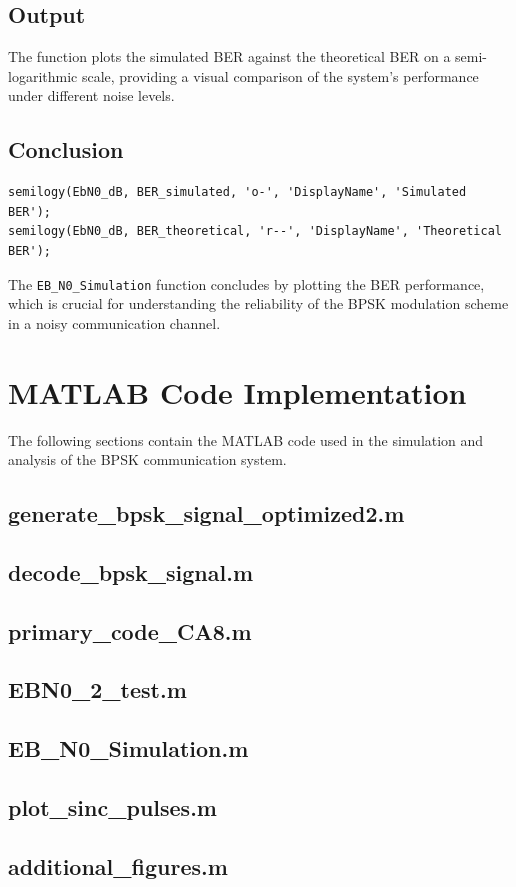 \documentclass[11pt]{article}
\begin{document}
\subsection*{Output}
The function plots the simulated BER against the theoretical BER on a semi-logarithmic scale, providing a visual comparison of the system's performance under different noise levels.

\subsection*{Conclusion}
\begin{verbatim}
semilogy(EbN0_dB, BER_simulated, 'o-', 'DisplayName', 'Simulated BER');
semilogy(EbN0_dB, BER_theoretical, 'r--', 'DisplayName', 'Theoretical BER');
\end{verbatim}
The \texttt{EB\_N0\_Simulation} function concludes by plotting the BER performance, which is crucial for understanding the reliability of the BPSK modulation scheme in a noisy communication channel.


\section*{MATLAB Code Implementation}

The following sections contain the MATLAB code used in the simulation and analysis of the BPSK communication system.

\subsection*{generate\_bpsk\_signal\_optimized2.m}


\subsection*{decode\_bpsk\_signal.m}


\subsection*{primary\_code\_CA8.m}


\subsection*{EBN0\_2\_test.m}


\subsection*{EB\_N0\_Simulation.m}


\subsection*{plot\_sinc\_pulses.m}


\subsection*{additional\_figures.m}

\end{document}

